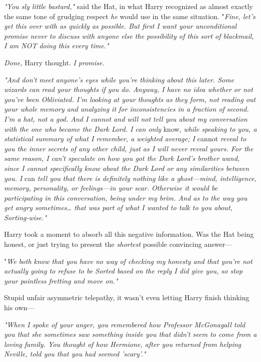 \emph{"You sly little bastard,"} said the Hat, in what Harry recognized as 
almost exactly the same tone of grudging respect \emph{he} would use in the 
same situation. "\emph{Fine, let's get this over with as quickly as possible. 
But first I want your unconditional promise never to discuss with anyone else 
the possibility of this sort of blackmail, I am NOT doing this every time."}

\emph{Done,} Harry thought. \emph{I promise.}

\emph{"And don't meet anyone's eyes while you're thinking about this later. 
Some wizards can read your thoughts if you do. Anyway, I have no idea whether 
or not you've been Obliviated. I'm looking at your thoughts as they form, not 
reading out your whole memory and analyzing it for inconsistencies in a 
fraction of second. I'm a hat, not a god. And I cannot and will not tell you 
about my conversation with the one who became the Dark Lord. I can only} 
know,\emph{ while speaking to you, a statistical summary of what I remember, a 
weighted average; I} cannot\emph{ reveal to you the inner secrets of any other 
child, just as I will never reveal yours. For the same reason, I can't 
speculate on how you got the Dark Lord's brother wand, since I cannot 
specifically know about the Dark Lord or any similarities between you. I} 
can\emph{ tell you that there is definitely nothing like a ghost---mind, 
intelligence, memory, personality, or feelings---in your scar. Otherwise it 
would be participating in this conversation, being under my brim. And as to the 
way you get angry sometimes{\ldots} that was part of what I wanted to talk to 
you about, Sorting-wise."}

Harry took a moment to absorb all this negative information. Was the Hat being 
honest, or just trying to present the \emph{shortest} possible convincing 
answer---

"\emph{We both know that you have no way of checking my honesty and that you're 
not actually going to refuse to be Sorted based on the reply I did give you, so 
stop your pointless fretting and move on."}

Stupid unfair asymmetric telepathy, it wasn't even letting Harry finish 
thinking his own---

\emph{"When I spoke of your anger, you remembered how Professor McGonagall told 
you that she sometimes saw something inside you that didn't seem to come from a 
loving family. You thought of how Hermione, after you returned from helping 
Neville, told you that you had seemed 'scary'."}


